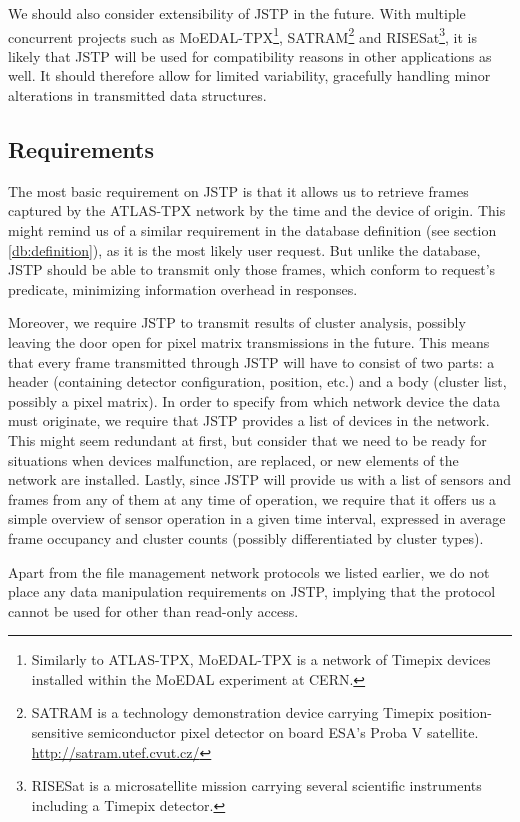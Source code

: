 We should also consider extensibility of JSTP in the future. With multiple concurrent projects such as MoEDAL-TPX\footnote{Similarly to ATLAS-TPX, MoEDAL-TPX is a network of Timepix devices installed within the MoEDAL experiment at CERN.}, SATRAM\footnote{SATRAM is a technology demonstration device carrying Timepix position-sensitive semiconductor pixel detector on board ESA’s Proba V satellite. \url{http://satram.utef.cvut.cz/}} and RISESat\footnote{RISESat is a microsatellite mission carrying several scientific instruments including a Timepix detector.}, it is likely that JSTP will be used for compatibility reasons in other applications as well. It should therefore allow for limited variability, gracefully handling minor alterations in transmitted data structures.

\subsection{Requirements}
The most basic requirement on JSTP is that it allows us to retrieve frames captured by the ATLAS-TPX network by the time and the device of origin. This might remind us of a similar requirement in the database definition (see section \ref{db:definition}), as it is the most likely user request. But unlike the database, JSTP should be able to transmit only those frames, which conform to request's predicate, minimizing information overhead in responses.

Moreover, we require JSTP to transmit results of cluster analysis, possibly leaving the door open for pixel matrix transmissions in the future. This means that every frame transmitted through JSTP will have to consist of two parts: a header (containing detector configuration, position, etc.) and a body (cluster list, possibly a pixel matrix). In order to specify from which network device the data must originate, we require that JSTP provides a list of devices in the network. This might seem redundant at first, but consider that we need to be ready for situations when devices malfunction, are replaced, or new elements of the network are installed. Lastly, since JSTP will provide us with a list of sensors and frames from any of them at any time of operation, we require that it offers us a simple overview of sensor operation in a given time interval, expressed in average frame occupancy and cluster counts (possibly differentiated by cluster types).

Apart from the file management network protocols we listed earlier, we do not place any data manipulation requirements on JSTP, implying that the protocol cannot be used for other than read-only access.

